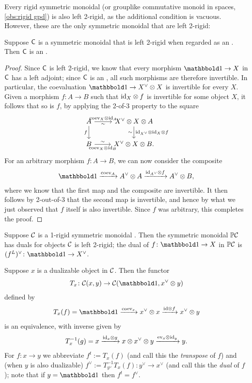 \documentclass[a4paper,11pt]{article}
\begin{document}
Every rigid symmetric monoidal \igpd{} (or grouplike commutative
monoid in spaces, \cref{obs:rigid gpd}) is also left 2-rigid, as the
additional condition is vacuous. However, these are the only
symmetric monoidal \icats{} that are left 2-rigid:
\begin{propn}\label{propn:left 2-rigid cat is gpd}
  Suppose $\textup{\textsf{C}}$ is a symmetric monoidal \icat{} that is left 2-rigid
  when regarded as an \itcat{}. Then $\textup{\textsf{C}}$ is an \igpd{}.
\end{propn}
\begin{proof}
  Since $\textup{\textsf{C}}$ is left 2-rigid, we know that every morphism $\bbone \to X$ in
  $\textup{\textsf{C}}$ has a left adjoint; since $\textup{\textsf{C}}$ is an \icat{}, all such
  morphisms are therefore invertible. In
  particular, the coevaluation $\bbone \to X^{\vee} \otimes X$ is
  invertible for every $X$. Given a morphism $f \colon A
  \to B$ such that $\text{\textup{id}}_{X} \otimes f$ is invertible for some object $X$, it follows that so is
  $f$, by applying the 2-of-3 property to the square
  \[
    \begin{tikzcd}
     A \ar[r, "\mathrm{coev}_{X} \otimes \id_{A}", "\sim"'] \ar[d,
     "f"'] & X^{\vee}\otimes X \otimes A  \ar[d, "\id_{X^{\vee}}
     \otimes \id_{X} \otimes f", "\sim"'] \\
     B \ar[r, "\mathrm{coev}_{X} \otimes \id_{B}"', "\sim"] & X^{\vee}\otimes X \otimes B.
    \end{tikzcd}
  \]
  For an 
  arbitrary morphism $f \colon A \to B$, we can now consider the
  composite 
  \[ \bbone \xto{\coev_{A}} A^{\vee} \otimes A \xto{\id_{A^{\vee}} \otimes f}
    A^{\vee} \otimes B, \]
  where we know that the first map and the composite are
  invertible. It then follows by 2-out-of-3 that the second map is invertible, and
  hence by what we just observed that $f$ itself is also
  invertible. Since $f$ was arbitrary, this completes the proof.
\end{proof}


\begin{propn}\label{propn:PCdualadj}
  Suppose $\mathcal{C}$ is a 1-rigid symmetric monoidal \incat{}. Then the symmetric monoidal
  \inmcat{}
  $\mathbb{P} \mathcal{C}$ has duals for objects \IFF{} $\mathcal{C}$ is left 2-rigid; the
  dual of $f \colon \bbone \to X$ in $\mathbb{P}\mathcal{C}$ is
  $(f^{L})^{\vee} \colon \bbone \to X^{\vee}$.
\end{propn}


\begin{notation}
  Suppose $x$ is a dualizable object in $\mathcal{C}$. Then the functor
  \[ T_{x} \colon \nC(x,y) \to \nC(\bbone, x^{\vee} \otimes y)\]
  defined by
  \[T_{x}(f) = \bbone \xto{\coev_{x}} x^{\vee} \otimes x \xto{\id
      \otimes f} x^{\vee} \otimes y\]
  is an equivalence, with inverse given by
  \[ T_{x}^{-1}(g) = x \xto{\id_{x} \otimes g} x \otimes x^{\vee} \otimes
    y \xto{\ev_{x} \otimes \id_{y}} y.\]
  For $f \colon x \to y$ we abbreviate $f^{t} := T_{x}(f)$ (and call this the
  \emph{transpose} of $f$) and (when $y$ is also dualizable) $f^{\vee}
  := T_{y^{\vee}}^{-1}T_{x}(f)\colon y^{\vee} \to x^{\vee}$ (and call
  this the \emph{dual} of $f$); note that if $y = \bbone$ then $f^{t}
  = f^{\vee}$. 
\end{notation}
\end{document}
